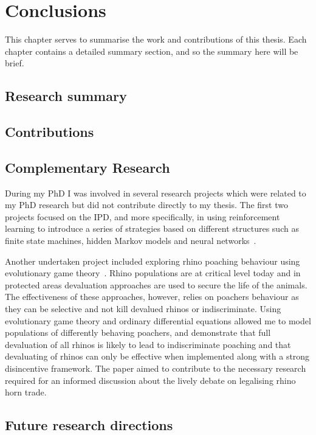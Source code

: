 \chapter{Conclusions}\label{chapter:conclusion}

This chapter serves to summarise the work and contributions of this thesis. Each
chapter contains a detailed summary section, and so the summary here will be
brief.

\section{Research summary}

\section{Contributions}

\section{Complementary Research}

During my PhD I was involved in several research projects which were related to
my PhD research but did not contribute directly to my thesis. The first two
projects focused on the IPD, and more specifically, in using
reinforcement learning to introduce a series of strategies based on different
structures such as finite state machines, hidden Markov models and neural
networks~\cite{Knight2017, Harper2017}.

Another undertaken project included exploring rhino poaching behaviour
using evolutionary game theory~\cite{Glynatsi2018}. Rhino populations are at
critical level today and in protected areas devaluation approaches are used to
secure the life of the animals. The effectiveness of
these approaches, however, relies on poachers behaviour as they can be selective
and not kill devalued rhinos or indiscriminate. Using evolutionary game theory
and ordinary differential equations allowed me to model populations of
differently behaving poachers, and demonstrate that full devaluation of all rhinos is
likely to lead to indiscriminate poaching and that devaluating of rhinos can
only be effective when implemented along with a strong disincentive framework.
The paper aimed to contribute to the necessary research required for an informed
discussion about the lively debate on legalising rhino horn trade.

\section{Future research directions}

